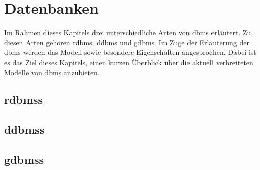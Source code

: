 \chapter{Datenbanken}
Im Rahmen dieses Kapitels drei unterschiedliche Arten von \acl{dbms} erläutert. Zu diesen Arten gehören \acl{rdbms}, \acl{ddbms} und \acl{gdbms}. Im Zuge der Erläuterung der \acs{dbms} werden das Modell sowie besondere Eigenschaften angesprochen. Dabei ist es das Ziel dieses Kapitels, einen kurzen Überblick über die aktuell verbreiteten Modelle von \acl{dbms} anzubieten. 

\section{\acl{rdbms}s}

\section{\acl{ddbms}s}

\section{\acl{gdbms}s}

